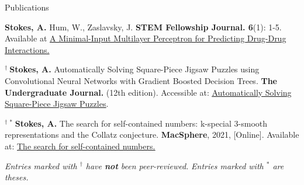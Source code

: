 \begin{rSection}{Publications}
\begin{enumerate}[label={[\arabic*]}]
  \item {\bf Stokes, A.} Hum, W., Zaslavsky, J. \textbf{STEM Fellowship Journal. 6}(1): 1-5. Available at \underline{\href{https://journal.stemfellowship.org/doi/10.17975/sfj-2020-006}{A Minimal-Input Multilayer Perceptron for Predicting Drug-Drug Interactions.}}
  
  \item $^\dagger \ ${\bf Stokes, A.} Automatically Solving Square-Piece Jigsaw Puzzles using Convolutional Neural Networks with Gradient Boosted Decision Trees. \textbf{The Undergraduate Journal.} (12th edition). Accessible at: \underline{\href{https://gua.soutron.net/Portal/Default/en-GB/RecordView/Index/61}{Automatically Solving Square-Piece Jigsaw Puzzles}}.
  \item $^{\dagger \ \ast \ }${\bf Stokes, A.} The search for self-contained numbers: k-special 3-smooth representations and the Collatz conjecture. \textbf{MacSphere}, 2021, [Online]. Available at: \underline{\href{https://macsphere.mcmaster.ca/handle/11375/27543}{The search for self-contained numbers.}}

\end{enumerate}

\smallskip
\emph{Entries marked with $^\dagger$ have \textbf{not} been peer-reviewed.} \hfill
\emph{Entries marked with $^\ast$ are theses.}

\end{rSection}
